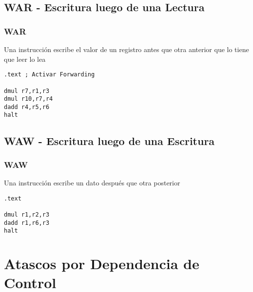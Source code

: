 \documentclass{beamer}
\begin{document}
\subsection{WAR - Escritura luego de una Lectura}
\begin{frame}[fragile]
\frametitle{WAR}
Una instrucción escribe el valor de un registro antes que otra anterior que lo tiene que leer lo lea
\begin{block}{}
\begin{lstlisting}[language=WinMIPS64,basicstyle=\ttfamily,keywordstyle=\color{blue}]
.text ; Activar Forwarding

dmul r7,r1,r3
dmul r10,r7,r4
dadd r4,r5,r6
halt
\end{lstlisting}
\end{block}

\end{frame}


\subsection{WAW - Escritura luego de una Escritura}
\begin{frame}[fragile]
\frametitle{WAW}
Una instrucción escribe un dato después que otra posterior
\begin{block}{}
\begin{lstlisting}[language=WinMIPS64,basicstyle=\ttfamily,keywordstyle=\color{blue}]
.text

dmul r1,r2,r3
dadd r1,r6,r3
halt
\end{lstlisting}
\end{block}

\end{frame}

\section{Atascos por Dependencia de Control}
\end{document}
